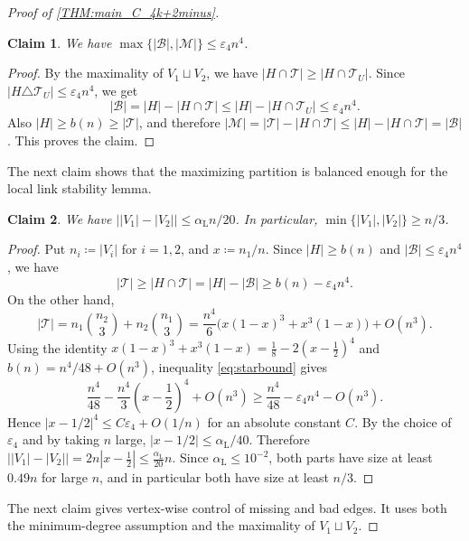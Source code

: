 \documentclass[10pt,a4paper]{article}
\theoremstyle{plain}
\newtheorem{claim}[claim]{Claim}
\theoremstyle{definition}
\begin{document}
\begin{proof}[Proof of \cref{THM:main_C_4k+2minus}]
\begin{claim}\label{clm:BM-upper}
We have $\max\{|\mathcal B|,|\mathcal M|\}\le \varepsilon_4n^4$. 
\end{claim}

\begin{proof}
By the maximality of $V_1\sqcup V_2$, we have $|H\cap \mathcal T|\ge |H\cap \mathcal T_U|$. 
Since $|H\triangle \mathcal T_U|\le \varepsilon_4n^4$, we get
\[
|\mathcal B|=|H|-|H\cap \mathcal T|
\le |H|-|H\cap \mathcal T_U|
\le \varepsilon_4n^4.
\]
Also $|H|\ge b(n)\ge |\mathcal T|$, and therefore $|\mathcal M|=|\mathcal T|-|H\cap \mathcal T| \le |H|-|H\cap \mathcal T|=|\mathcal B|$. 
This proves the claim.
\end{proof}



The next claim shows that the maximizing partition is balanced enough for the local link stability lemma.

\begin{claim}\label{clm:part-size}
We have $\bigl||V_1|-|V_2|\bigr|\le {\alpha_{\mathrm L} n}/{20}$. 
In particular, $\min\{|V_1|,|V_2|\} \ge n/3$.
\end{claim}

\begin{proof}
Put $n_i\coloneqq|V_i|$ for $i=1,2$, and $x\coloneqq n_1/n$. Since $|H|\ge b(n)$ and $|\mathcal B|\le\varepsilon_4n^4$, we have 
\begin{equation}\label{eq:starbound}
|\mathcal T|
\ge |H\cap \mathcal T|
=|H|-|\mathcal B|
\ge b(n)-\varepsilon_4n^4.
\end{equation}
On the other hand,
\[
|\mathcal T|=n_1\binom{n_2}{3}+n_2\binom{n_1}{3}
=\frac{n^4}{6}\bigl(x(1-x)^3+x^3(1-x)\bigr)+O(n^3).
\]
Using the identity $x(1-x)^3+x^3(1-x)=\frac18-2\left(x-\frac12\right)^4$ and $b(n)=n^4/48+O(n^3)$, inequality \eqref{eq:starbound} gives
\[
\frac{n^4}{48}-\frac{n^4}{3}\left(x-\frac12\right)^4+O(n^3)
\ge \frac{n^4}{48}-\varepsilon_4n^4-O(n^3).
\]
Hence $|x-1/2|^4\le C\varepsilon_4+O(1/n)$ for an absolute constant $C$. By the choice of $\varepsilon_4$ and by taking $n$ large, $|x-1/2|\le \alpha_{\mathrm L}/40$. Therefore $\bigl||V_1|-|V_2|\bigr|=2n\left|x-\frac12\right|\le \frac{\alpha_{\mathrm L}}{20}n$.
Since $\alpha_{\mathrm L}\le10^{-2}$, both parts have size at least $0.49n$ for large $n$, and in particular both have size at least $n/3$.
\end{proof}

The next claim gives vertex-wise control of missing and bad edges. It uses both the minimum-degree assumption and the maximality of $V_1\sqcup V_2$.


\end{proof}
\end{document}

